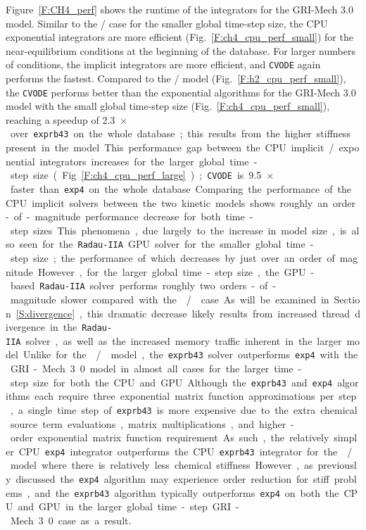 \documentclass[preprint,review,11pt]{elsarticle}
\begin{document}
Figure~\ref{F:CH4_perf} shows the runtime of the integrators for the GRI-Mech 3.0 model.
Similar to the \slash{} case for the smaller global time-step size, the CPU exponential integrators are more efficient (Fig.~\ref{F:ch4_cpu_perf_small}) for the near-equilibrium conditions at the beginning of the database.
For larger numbers of conditions, the implicit integrators are more efficient, and \texttt{CVODE} again performs the fastest.
Compared to the \slash{} model (Fig.~\ref{F:h2_cpu_perf_small}), the \texttt{CVODE} performs better than the exponential algorithms for the GRI-Mech 3.0 model with the small global time-step size (Fig.~\ref{F:ch4_cpu_perf_small}), reaching a speedup of \SI{2.3}{$\times$} over \texttt{exprb43} on the whole database; this results from the higher stiffness present in the model.
This performance gap between the CPU implicit\slash exponential integrators increases for the larger global time-step size (Fig.~\ref{F:ch4_cpu_perf_large}); \texttt{CVODE} is \SI{9.5}{$\times$} faster than \texttt{exp4} on the whole database.
Comparing the performance of the CPU implicit solvers between the two kinetic models shows roughly an order-of-magnitude performance decrease for both time-step sizes.
This phenomena, due largely to the increase in model size, is also seen for the \texttt{Radau-IIA} GPU solver for the smaller global time-step size; the performance of which decreases by just over an order of magnitude.
However, for the larger global time-step size, the GPU-based \texttt{Radau-IIA} solver performs roughly two orders-of-magnitude slower compared with the \slash{} case.
As will be examined in Section~\ref{S:divergence}, this dramatic decrease likely results from increased thread divergence in the \texttt{Radau-IIA} solver, as well as the increased memory traffic inherent in the larger model.

Unlike for the \slash{} model, the \texttt{exprb43} solver outperforms \texttt{exp4} with the GRI-Mech 3.0 model in almost all cases for the larger time-step size for both the CPU and GPU.
Although the \texttt{exprb43} and \texttt{exp4} algorithms each require three exponential matrix function approximations per step, a single time step of \texttt{exprb43} is more expensive due to the extra chemical source term evaluations, matrix multiplications, and higher-order exponential matrix function requirement.
As such, the relatively simpler CPU \texttt{exp4} integrator outperforms the CPU \texttt{exprb43} integrator for the \slash{} model where there is relatively less chemical stiffness.
However, as previously discussed the \texttt{exp4} algorithm may experience order reduction for stiff problems, and the \texttt{exprb43} algorithm typically outperforms \texttt{exp4} on both the CPU and GPU in the larger global time-step GRI-Mech 3.0 case as a result.
\end{document}
